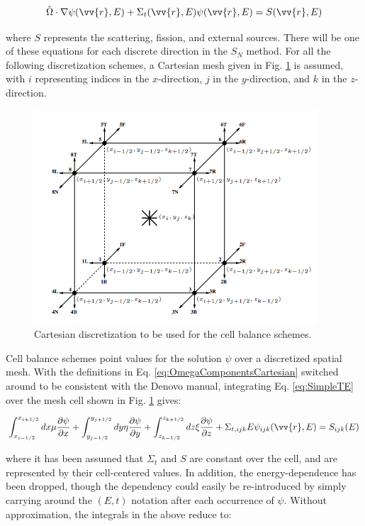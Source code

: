 \documentclass[10pt]{article}
\newcounter{subsubsubsection}[subsubsection]
\begin{document}
\begin{flushleft}
\begin{equation}
\label{eq:SimpleTE}
\hat{\Omega}\cdot\nabla\psi(\vv{r},E)+\Sigma_t({\vv{r},E})\psi(\vv{r},E)=S(\vv{r},E)
\end{equation}

where \(S\) represents the scattering, fission, and external sources. There will be one of these equations for each discrete direction in the \(S_N\) method. For all the following discretization schemes, a Cartesian mesh given in Fig. \ref{fig:CartesianDiscretization} is assumed, with \(i\) representing indices in the \(x\)-direction, \(j\) in the \(y\)-direction, and \(k\) in the \(z\)-direction.

\begin{figure}[H]
\centering
\includegraphics[width=0.6\linewidth]{figures/CartesianDiscretization.jpg}
\caption{Cartesian discretization to be used for the cell balance schemes.}
\label{fig:CartesianDiscretization}
\end{figure}


Cell balance schemes point values for the solution \(\psi\) over a discretized spatial mesh. With the definitions in Eq. \eqref{eq:OmegaComponentsCartesian} switched around to be consistent with the Denovo manual, integrating Eq. \eqref{eq:SimpleTE} over the mesh cell shown in Fig. \ref{fig:CartesianDiscretization} gives:

\begin{equation}
\int_{x_{i-1/2}}^{x_{i+1/2}}dx\mu \frac{\partial \psi}{\partial x}+\int_{y_{j-1/2}}^{y_{j+1/2}}dy\eta \frac{\partial \psi}{\partial y}+\int_{z_{k-1/2}}^{z_{k+1/2}}dz\xi \frac{\partial \psi}{\partial z}+\Sigma_{t,ijk}{E}\psi_{ijk}(\vv{r},E)=S_{ijk}(E)
\end{equation}

where it has been assumed that \(\Sigma_t\) and \(S\) are constant over the cell, and are represented by their cell-centered values. In addition, the energy-dependence has been dropped, though the dependency could easily be re-introduced by simply carrying around the \((E, t)\) notation after each occurrence of \(\psi\). Without approximation, the integrals in the above reduce to:


\end{flushleft}
\end{document}
